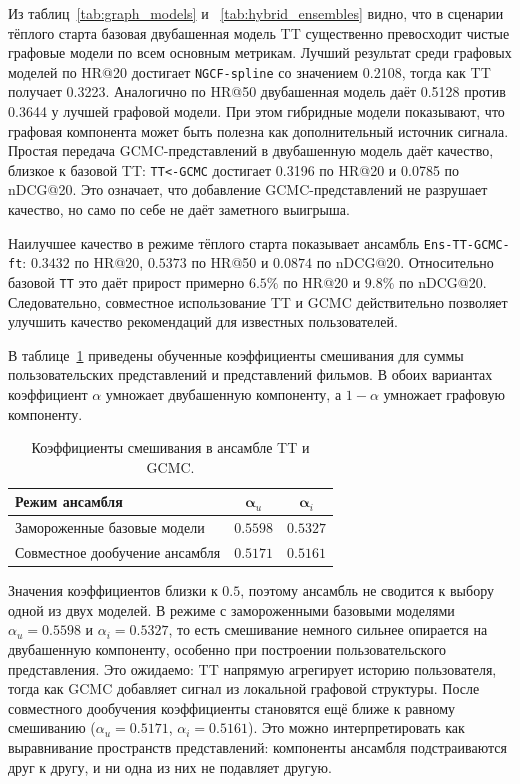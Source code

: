 \documentclass[12pt,fleqn]{article}
\begin{document}
Из таблиц~\ref{tab:graph_models} и ~\ref{tab:hybrid_ensembles} видно, что в
сценарии тёплого старта базовая двубашенная модель TT существенно превосходит
чистые графовые модели по всем основным метрикам. Лучший результат среди
графовых моделей по HR@20 достигает \texttt{NGCF-spline} со значением 0.2108,
тогда как TT получает 0.3223. Аналогично по HR@50 двубашенная модель даёт
0.5128 против 0.3644 у лучшей графовой модели. При этом гибридные модели показывают, что графовая компонента может быть
полезна как дополнительный источник сигнала. Простая передача GCMC-представлений
в двубашенную модель даёт качество, близкое к базовой TT: \texttt{TT<-GCMC}
достигает 0.3196 по HR@20 и 0.0785 по nDCG@20. Это означает, что добавление
GCMC-представлений не разрушает качество, но само по себе не даёт заметного
выигрыша. 

Наилучшее качество в режиме тёплого старта показывает ансамбль \texttt{Ens-TT-GCMC-ft}:
$0.3432$ по HR@20, $0.5373$ по HR@50 и $0.0874$ по nDCG@20.
Относительно базовой \texttt{TT} это даёт прирост примерно $6.5\%$ по
HR@20 и $9.8\%$ по nDCG@20. Следовательно, совместное использование
TT и GCMC действительно позволяет улучшить качество рекомендаций для известных
пользователей.

В таблице~\ref{tab:ensemble_alpha} приведены обученные коэффициенты
смешивания для суммы пользовательских представлений и представлений фильмов. В обоих вариантах
коэффициент $\alpha$ умножает двубашенную компоненту, а $1-\alpha$ умножает
графовую компоненту.

\begin{table}[H]
\centering
\caption{Коэффициенты смешивания в ансамбле TT и GCMC.}
\label{tab:ensemble_alpha}
\begin{tabular}{lcc}
\toprule
\textbf{Режим ансамбля} & $\boldsymbol{\alpha}_u$ & $\boldsymbol{\alpha}_i$ \\
\midrule
Замороженные базовые модели & $0.5598$ & $0.5327$ \\
Совместное дообучение ансамбля & $0.5171$ & $0.5161$ \\
\bottomrule
\end{tabular}
\end{table}

Значения коэффициентов близки к $0.5$, поэтому ансамбль не сводится к выбору
одной из двух моделей. В режиме с замороженными базовыми моделями
$\alpha_u=0.5598$ и $\alpha_i=0.5327$, то есть смешивание немного сильнее
опирается на двубашенную компоненту, особенно при построении пользовательского
представления. Это ожидаемо: TT напрямую агрегирует историю пользователя, тогда
как GCMC добавляет сигнал из локальной графовой структуры. После совместного
дообучения коэффициенты становятся ещё ближе к равному смешиванию
($\alpha_u=0.5171$, $\alpha_i=0.5161$). Это можно интерпретировать как
выравнивание пространств представлений: компоненты ансамбля подстраиваются друг
к другу, и ни одна из них не подавляет другую.
\end{document}
